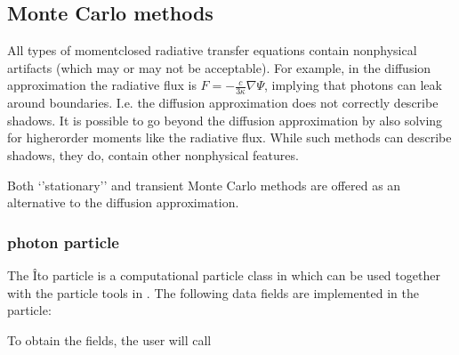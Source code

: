 \documentclass[letterpaper,10pt,english]{sphinxmanual}
\begin{document}
\subsection{Monte Carlo methods}
\label{\detokenize{Solvers/RTE:monte-carlo-methods}}\label{\detokenize{Solvers/RTE:chap-montecarlorte}}
All types of moment\sphinxhyphen{}closed radiative transfer equations contain nonphysical artifacts (which may or may not be acceptable).
For example, in the diffusion approximation the radiative flux is \(F = -\frac{c}{3\kappa}\nabla \Psi\), implying that photons can leak around boundaries.
I.e. the diffusion approximation does not correctly describe shadows.
It is possible to go beyond the diffusion approximation by also solving for higher\sphinxhyphen{}order moments like the radiative flux.
While such methods can describe shadows, they do, contain other nonphysical features.

Both ‘’stationary’’ and transient Monte Carlo methods are offered as an alternative to the diffusion approximation.


\subsubsection{photon particle}
\label{\detokenize{Solvers/RTE:photon-particle}}
The Îto particle is a computational particle class in  which can be used together with the particle tools in .
The following data fields are implemented in the particle:

\begin{sphinxVerbatim}[commandchars=\\\{\},formatcom=\scriptsize]
 
 
 
 
\end{sphinxVerbatim}

To obtain the fields, the user will call

\begin{sphinxVerbatim}[commandchars=\\\{\},formatcom=\scriptsize]
 
 
 
 
\end{sphinxVerbatim}
\end{document}
